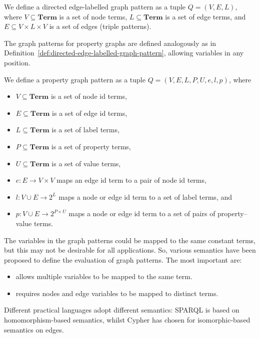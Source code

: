 \begin{definition}\label{def:directed-edge-labelled-graph-pattern}
    We define a directed edge-labelled graph pattern as a tuple $Q = (V, E, L)$, where $V \subseteq \textbf{Term}$ is a set of node terms, $L \subseteq \textbf{Term}$ is a set of edge terms, and $E \subseteq V \times L \times V$ is a set of edges (triple patterns).
\end{definition}

The graph patterns for property graphs are defined analogously as in Definition~\ref{def:directed-edge-labelled-graph-pattern}, allowing variables in any position.
    
\begin{definition}\label{def:property-graph-pattern}
    We define a property graph pattern as a tuple $Q = (V, E, L, P, U, e, l, p)$, where
    \begin{itemize}
        \item $V \subseteq \textbf{Term}$ is a set of node id terms,
        \item $E \subseteq \textbf{Term}$ is a set of edge id terms,
        \item $L \subseteq \textbf{Term}$ is a set of label terms,
        \item $P \subseteq \textbf{Term}$ is a set of property terms,
        \item $U \subseteq \textbf{Term}$ is a set of value terms,
        \item $e : E \to V \times V$ maps an edge id term to a pair of node id terms,
        \item $l : V \cup E \to 2^L$ maps a node or edge id term to a set of label terms, and
        \item $p : V \cup E \to 2^{P \times U}$ maps a node or edge id term to a set of pairs of property–value terms.
    \end{itemize}
    \end{definition}

The variables in the graph patterns could be mapped to the same constant terms, but this may not be desirable for all applications. So, various semantics have been proposed to define the evaluation of graph patterns. The most important are:
\begin{itemize}
    \item{} allows multiple variables to be mapped to the same term.
    \item{} requires nodes and edge variables to be mapped to distinct terms. 
\end{itemize}
Different practical languages adopt different semantics: SPARQL is based on homomorphism-based semantics, whilst Cypher has chosen for isomorphic-based semantics on edges.

